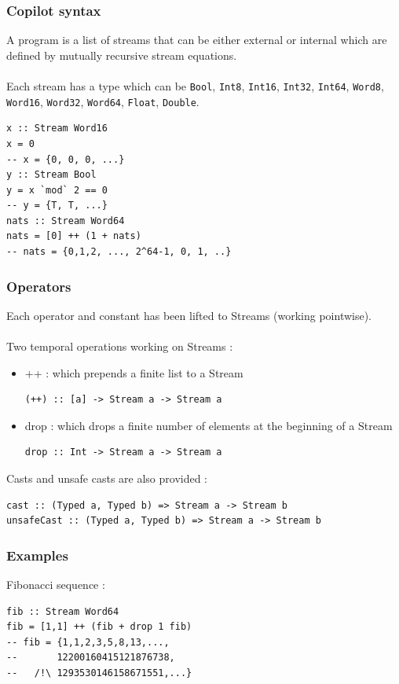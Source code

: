 \documentclass{beamer}
\begin{document}
\begin{frame}[fragile]
  		\frametitle{Copilot syntax}
  		A program is a list of streams that can be either external  or internal which are defined by mutually recursive stream equations.
  		\\~\\
  		Each stream has a type which can be \texttt{Bool}, \texttt{Int8}, \texttt{Int16}, \texttt{Int32}, \texttt{Int64}, \texttt{Word8}, \texttt{Word16}, \texttt{Word32}, \texttt{Word64}, \texttt{Float}, \texttt{Double}.
  		
\begin{verbatim}
x :: Stream Word16
x = 0
-- x = {0, 0, 0, ...}
y :: Stream Bool
y = x `mod` 2 == 0
-- y = {T, T, ...}
nats :: Stream Word64
nats = [0] ++ (1 + nats)
-- nats = {0,1,2, ..., 2^64-1, 0, 1, ..}  
\end{verbatim}
\end{frame}
  	
\begin{frame}[fragile]
	\frametitle{Operators}
  		Each operator and constant has been lifted to Streams (working pointwise). \\~\\
  		Two temporal operations working on Streams : 
  		\begin{itemize}
  			\item ++ : which prepends a finite list to a Stream

\begin{verbatim}
(++) :: [a] -> Stream a -> Stream a
\end{verbatim}
  			\item drop : which drops a finite number of elements at the beginning of a Stream
\begin{verbatim}
drop :: Int -> Stream a -> Stream a  
\end{verbatim}
  		\end{itemize}
  		
Casts and unsafe casts are also provided :
\begin{verbatim}
cast :: (Typed a, Typed b) => Stream a -> Stream b
unsafeCast :: (Typed a, Typed b) => Stream a -> Stream b
\end{verbatim}
\end{frame}
  	
\begin{frame}[fragile]
  		\frametitle{Examples}
	Fibonacci sequence :
\begin{verbatim}
fib :: Stream Word64
fib = [1,1] ++ (fib + drop 1 fib) 
-- fib = {1,1,2,3,5,8,13,...,
--       12200160415121876738,
--   /!\ 1293530146158671551,...}
\end{verbatim}

\end{frame}
\end{document}
